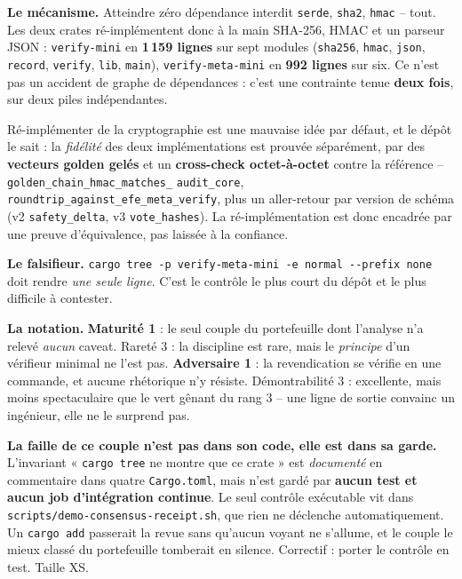 \documentclass[10pt]{article}
\newcommand{\best}[1]{{\color{green}\textbf{#1}}}
\newcommand{\sz}[1]{{\small\color{grey}\textsf{#1}}}
\newcommand{\code}[1]{\texttt{\small #1}}
\begin{document}
\textbf{Le mécanisme.} Atteindre zéro dépendance interdit \code{serde}, \code{sha2}, \code{hmac} --
tout. Les deux crates ré-implémentent donc à la main SHA-256, HMAC et un parseur JSON :
\code{verify-mini} en \textbf{1\,159 lignes} sur sept modules
\sz{(\code{sha256}, \code{hmac}, \code{json}, \code{record}, \code{verify}, \code{lib}, \code{main})},
\code{verify-meta-mini} en \textbf{992 lignes} sur six. Ce n'est pas un accident de graphe de
dépendances : c'est une contrainte tenue \textbf{deux fois}, sur deux piles indépendantes.

Ré-implémenter de la cryptographie est une mauvaise idée par défaut, et le dépôt le sait : la
\emph{fidélité} des deux implémentations est prouvée séparément, par des \textbf{vecteurs golden gelés}
et un \textbf{cross-check octet-à-octet} contre la référence -- \code{golden\_chain\_hmac\_matches\_}
\code{audit\_core}, \code{roundtrip\_against\_efe\_meta\_verify}, plus un aller-retour par version de
schéma \sz{(v2 \code{safety\_delta}, v3 \code{vote\_hashes})}. La ré-implémentation est donc encadrée
par une preuve d'équivalence, pas laissée à la confiance.

\textbf{Le falsifieur.} \code{cargo tree -p verify-meta-mini -e normal -{}-prefix none} doit rendre
\emph{une seule ligne}. C'est le contrôle le plus court du dépôt et le plus difficile à contester.

\textbf{La notation.} \best{Maturité 1} : le seul couple du portefeuille dont l'analyse n'a relevé
\emph{aucun} caveat. \sz{Rareté 3} : la discipline est rare, mais le \emph{principe} d'un vérifieur
minimal ne l'est pas. \best{Adversaire 1} : la revendication se vérifie en une commande, et aucune
rhétorique n'y résiste. \sz{Démontrabilité 3} : excellente, mais moins spectaculaire que le vert
gênant du rang 3 -- une ligne de sortie convainc un ingénieur, elle ne le surprend pas.

\begin{alerte}
\textbf{La faille de ce couple n'est pas dans son code, elle est dans sa garde.} L'invariant
« \code{cargo tree} ne montre que ce crate » est \emph{documenté} en commentaire dans quatre
\code{Cargo.toml}, mais n'est gardé par \textbf{aucun test et aucun job d'intégration continue}. Le
seul contrôle exécutable vit dans \code{scripts/demo-consensus-receipt.sh}, que rien ne déclenche
automatiquement. Un \code{cargo add} passerait la revue sans qu'aucun voyant ne s'allume, et le couple
le mieux classé du portefeuille tomberait en silence. \sz{Correctif : porter le contrôle en test.
Taille XS.}
\end{alerte}
\end{document}
